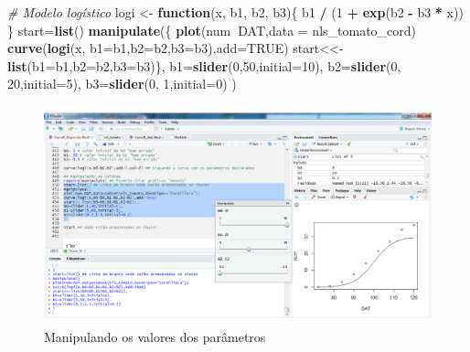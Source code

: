 \documentclass[
]{book}
\newenvironment{Shaded}{\begin{snugshade}}{\end{snugshade}}
\newcommand{\CommentTok}[1]{\textcolor[rgb]{0.56,0.35,0.01}{\textit{#1}}}
\newcommand{\ControlFlowTok}[1]{\textcolor[rgb]{0.13,0.29,0.53}{\textbf{#1}}}
\newcommand{\DataTypeTok}[1]{\textcolor[rgb]{0.13,0.29,0.53}{#1}}
\newcommand{\DecValTok}[1]{\textcolor[rgb]{0.00,0.00,0.81}{#1}}
\newcommand{\KeywordTok}[1]{\textcolor[rgb]{0.13,0.29,0.53}{\textbf{#1}}}
\newcommand{\NormalTok}[1]{#1}
\newcommand{\OperatorTok}[1]{\textcolor[rgb]{0.81,0.36,0.00}{\textbf{#1}}}
\newcommand{\OtherTok}[1]{\textcolor[rgb]{0.56,0.35,0.01}{#1}}
\newcommand{\StringTok}[1]{\textcolor[rgb]{0.31,0.60,0.02}{#1}}
\begin{document}
\begin{Shaded}
\begin{Highlighting}[]
\CommentTok{# Modelo logístico}
\NormalTok{logi <-}\StringTok{ }\ControlFlowTok{function}\NormalTok{(x, b1, b2, b3)\{}
\NormalTok{  b1 }\OperatorTok{/}\StringTok{ }\NormalTok{(}\DecValTok{1} \OperatorTok{+}\StringTok{ }\KeywordTok{exp}\NormalTok{(b2 }\OperatorTok{-}\StringTok{ }\NormalTok{b3 }\OperatorTok{*}\StringTok{ }\NormalTok{x))}
\NormalTok{\}}
\NormalTok{start=}\KeywordTok{list}\NormalTok{()}
\KeywordTok{manipulate}\NormalTok{(\{}
  \KeywordTok{plot}\NormalTok{(num}\OperatorTok{~}\NormalTok{DAT,}\DataTypeTok{data =}\NormalTok{ nls_tomato_cord)}
  \KeywordTok{curve}\NormalTok{(}\KeywordTok{logi}\NormalTok{(x, }\DataTypeTok{b1=}\NormalTok{b1,}\DataTypeTok{b2=}\NormalTok{b2,}\DataTypeTok{b3=}\NormalTok{b3),}\DataTypeTok{add=}\OtherTok{TRUE}\NormalTok{)}
\NormalTok{  start<<-}\KeywordTok{list}\NormalTok{(}\DataTypeTok{b1=}\NormalTok{b1,}\DataTypeTok{b2=}\NormalTok{b2,}\DataTypeTok{b3=}\NormalTok{b3)\},}
  \DataTypeTok{b1=}\KeywordTok{slider}\NormalTok{(}\DecValTok{0}\NormalTok{,}\DecValTok{50}\NormalTok{,}\DataTypeTok{initial=}\DecValTok{10}\NormalTok{),}
  \DataTypeTok{b2=}\KeywordTok{slider}\NormalTok{(}\DecValTok{0}\NormalTok{, }\DecValTok{20}\NormalTok{,}\DataTypeTok{initial=}\DecValTok{5}\NormalTok{),}
  \DataTypeTok{b3=}\KeywordTok{slider}\NormalTok{(}\DecValTok{0}\NormalTok{, }\DecValTok{1}\NormalTok{,}\DataTypeTok{initial=}\DecValTok{0}\NormalTok{)}
\NormalTok{)}
\end{Highlighting}
\end{Shaded}

\begin{figure}
\centering
\includegraphics{figures/Valor_inicial.png}
\caption{Manipulando os valores dos parâmetros}
\end{figure}
\end{document}
